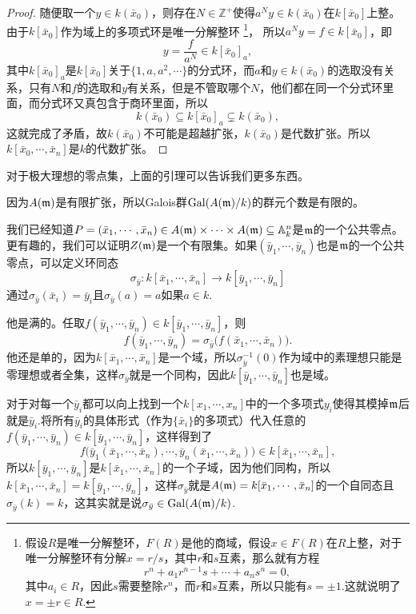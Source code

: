 \documentclass[9pt]{extarticle}
\theoremstyle{plain}%
\begin{document}
\begin{proof}
	随便取一个$y\in k(\bar{x}_0)$，则存在$N\in \mathbb{Z}^+$使得$a^Ny\in k(\bar{x}_0)$在$k[\bar{x}_0]$上整。由于$k[\bar{x}_0]$作为域上的多项式环是唯一分解整环
	\footnote{假设$R$是唯一分解整环，$F(R)$是他的商域，假设$x\in F(R)$在$R$上整，对于唯一分解整环有分解$x=r/s$，其中$r$和$s$互素，那么就有方程
	\[
		r^n+a_1r^{n-1}s+\cdots+a_n s^n=0,
	\]
	其中$a_i\in R$，因此$s$需要整除$r^n$，而$r$和$s$互素，所以只能有$s=\pm 1$.这就说明了$x=\pm r\in R$.}，
	所以$a^Ny=f\in k[\bar{x}_0]$，即
	\[
		y=\frac{f}{a^N}\in k[\bar{x}_0]_{a},
	\]
	其中$k[\bar{x}_0]_{a}$是$k[\bar{x}_0]$关于$\{1,a,a^2,\cdots\}$的分式环，而$a$和$y\in  k(\bar{x}_0)$的选取没有关系，只有$N$和$f$的选取和$y$有关系，但是不管取哪个$N$，他们都在同一个分式环里面，而分式环又真包含于商环里面，所以
	\[
		k(\bar{x}_0)\subseteq k[\bar{x}_0]_{a}\subsetneq k(\bar{x}_0),
	\]
	这就完成了矛盾，故$k(\bar{x}_0)$不可能是超越扩张，$k(\bar{x}_0)$是代数扩张。所以$k[\bar{x}_0,\cdots,\bar{x}_{n}]$是$k$的代数扩张。
\end{proof}

对于极大理想的零点集，上面的引理可以告诉我们更多东西。

因为$A(\mathfrak{m})$是有限扩张，所以Galois群$\mathrm{Gal}(A(\mathfrak{m})/k)$的群元个数是有限的。

我们已经知道$P=(\bar{x}_1,\cdots,\bar{x}_n)\in A(\mathfrak{m})\times \cdots\times A(\mathfrak{m})\subseteq \mathbb{A}^n_k$是$\mathfrak{m}$的一个公共零点。更有趣的，我们可以证明$Z(\mathfrak{m})$是一个有限集。如果$(\bar{y}_1,\cdots,\bar{y}_n)$也是$\mathfrak{m}$的一个公共零点，可以定义环同态
\[
	\sigma_{\bar{y}}:k[\bar{x}_1,\cdots,\bar{x}_n]\to k[\bar{y}_1,\cdots,\bar{y}_n]
\]
通过$\sigma_{\bar{y}}(\bar{x}_i)=\bar{y}_i$且$\sigma_{\bar{y}}(a)=a$如果$a\in k$.

他是满的。任取$f(\bar{y}_1,\cdots,\bar{y}_n)\in k[\bar{y}_1,\cdots,\bar{y}_n]$，则
\[
	f(\bar{y}_1,\cdots,\bar{y}_n)=\sigma_{\bar{y}}\bigl(f(\bar{x}_1,\cdots,\bar{x}_n)\bigr).
\]
他还是单的，因为$k[\bar{x}_1,\cdots,\bar{x}_n]$是一个域，所以$\sigma_{\bar{y}}^{-1}(0)$作为域中的素理想只能是零理想或者全集，这样$\sigma_{\bar{y}}$就是一个同构，因此$k[\bar{y}_1,\cdots,\bar{y}_n]$也是域。

对于对每一个$\bar{y}_i$都可以向上找到一个$k[x_1,\cdots,x_n]$中的一个多项式$y_i$使得其模掉$\mathfrak{m}$后就是$\bar{y}_i$.将所有$\bar{y}_i$的具体形式（作为$\{\bar{x}_i\}$的多项式）代入任意的$f(\bar{y}_1,\cdots,\bar{y}_n) \in k[\bar{y}_1,\cdots,\bar{y}_n]$，这样得到了
\[
	f\bigl(\bar{y}_1(\bar{x}_1,\cdots,\bar{x}_n),\cdots,\bar{y}_n(\bar{x}_1,\cdots,\bar{x}_n)\bigr) \in k[\bar{x}_1,\cdots,\bar{x}_n],
\]
所以$k[\bar{y}_1,\cdots,\bar{y}_n]$是$k[\bar{x}_1,\cdots,\bar{x}_n]$的一个子域，因为他们同构，所以$k[\bar{x}_1,\cdots,\bar{x}_n]=k[\bar{y}_1,\cdots,\bar{y}_n]$，这样$\sigma_{\bar{y}}$就是$A(\mathfrak{m})=k[\bar{x}_1,\cdots,\bar{x}_n]$的一个自同态且$\sigma_{\bar{y}}(k)=k$，这其实就是说$\sigma_{\bar{y}}\in \mathrm{Gal}(A(\mathfrak{m})/k)$.
\end{document}
